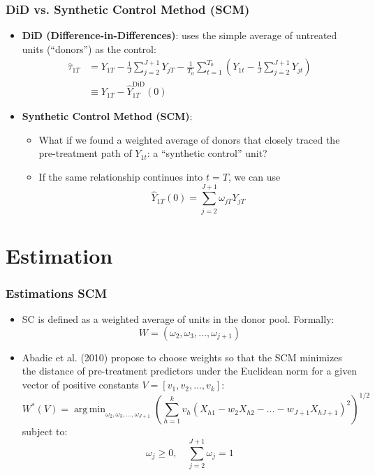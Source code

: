 \documentclass[xcolor=svgnames,t]{beamer}
\DeclareMathOperator*{\argmin}{arg\,min}
\begin{document}
\begin{frame}
    \frametitle{DiD vs. Synthetic Control Method (SCM)}
    \begin{itemize}
        \item<1-> \textbf{DiD (Difference-in-Differences)}: uses the simple average of untreated units (“donors”) as the control:
        \begin{align*}
        \hat{\tau}_{1T} &= Y_{1T} - \frac{1}{J} \sum_{j=2}^{J+1} Y_{jT} - \frac{1}{T_0} \sum_{t=1}^{T_0} \left( Y_{1t} - \frac{1}{J} \sum_{j=2}^{J+1} Y_{jt} \right) \\
        &\equiv Y_{1T} - \hat{Y}^{\text{DiD}}_{1T}(0)
        \end{align*}
        
        \item<2-> \textbf{Synthetic Control Method (SCM)}:
        \begin{itemize}
            \item<3-> What if we found a weighted average of donors that closely traced the pre-treatment path of \(Y_{1t}\): a “synthetic control” unit?
            \item<4-> If the same relationship continues into \(t = T\), we can use
            \[
            \hat{Y}_{1T}(0) = \sum_{j=2}^{J+1} \omega_{jT} Y_{jT}
            \]
        \end{itemize}
    \end{itemize}
\end{frame}

\section{Estimation}    
\begin{frame}
    \frametitle{Estimations SCM}
    \begin{itemize}
        \item<1-> SC is defined as a weighted average of units in the donor pool. Formally:
        \[
        W = (\omega_2, \omega_3, \dots, \omega_{j+1})
        \]
        
        \item<2-> Abadie et al. (2010) propose to choose weights so that the SCM minimizes the distance of pre-treatment predictors under the Euclidean norm for a given vector of positive constants \(V=[v_1, v_2, \dots, v_k]\):
        \[
            W^*(V) = \argmin_{\omega_2, \omega_3, \ldots, \omega_{J+1}}  \left( \sum_{h=1}^{k} v_h \left( X_{h1} - w_2 X_{h2} - \dots - w_{J+1} X_{hJ+1} \right)^2 \right)^{1/2}
        \]
        subject to:
\[
\omega_j \geq 0, \quad \sum_{j=2}^{J+1} \omega_j = 1
\]
 
    \end{itemize}
\end{frame}
\end{document}
